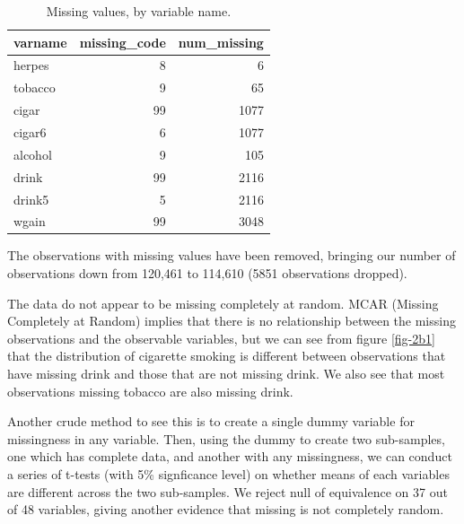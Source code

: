 \documentclass[12pt]{article}
\begin{document}
\begin{table}[ht]
\centering
\caption{Missing values, by variable name.} 
\begin{tabular}{lrr}
  \hline
varname & missing\_code & num\_missing \\ 
  \hline
herpes &   8 &   6 \\ 
  tobacco &   9 &  65 \\ 
  cigar &  99 & 1077 \\ 
  cigar6 &   6 & 1077 \\ 
  alcohol &   9 & 105 \\ 
  drink &  99 & 2116 \\ 
  drink5 &   5 & 2116 \\ 
  wgain &  99 & 3048 \\ 
   \hline
\end{tabular}
\end{table}

The observations with missing values have been removed, bringing our number of observations down from 120,461 to 114,610 (5851 observations dropped).

\vem
{}

The data do not appear to be missing completely at random. MCAR (Missing Completely at Random) implies that there is no relationship between the missing observations and the observable variables, but we can see from figure \ref{fig-2b1} that the distribution of cigarette smoking is different between observations that have missing drink and those that are not missing drink. We also see that most observations missing tobacco are also missing drink.

Another crude method to see this is to create a single dummy variable for missingness in any variable. Then, using the dummy to create two sub-samples, one which has complete data, and another with any missingness, we can conduct a series of t-tests (with 5\% signficance level) on whether means of each variables are different across the two sub-samples. We reject null of equivalence on 37 out of 48 variables, giving another evidence that missing is not completely random.
\end{document}
